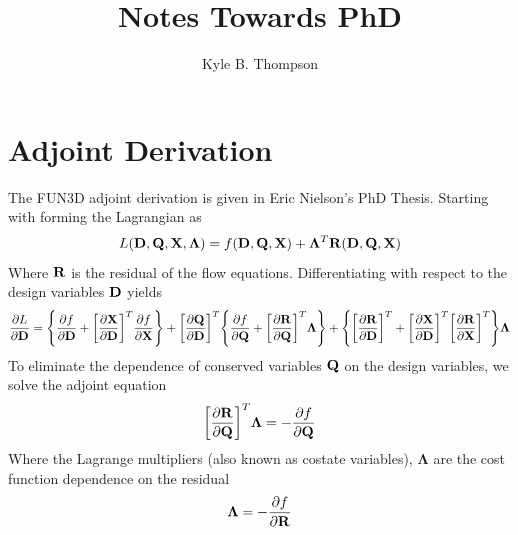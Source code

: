 \documentclass{article}   	%
\title{Notes Towards PhD}
\author{Kyle B. Thompson}
\begin{document}
\maketitle
\section{Adjoint Derivation}

The FUN3D adjoint derivation is given in Eric Nielson's PhD Thesis.  Starting
with forming the Lagrangian as
\begin{equation}
  L({\mathbf D},{\mathbf Q},{\mathbf X},\mathbf{\Lambda})=f({\mathbf D},{\mathbf Q},{\mathbf X})
  +\mathbf{\Lambda}^T{\mathbf R}({\mathbf D},{\mathbf Q},{\mathbf X})
\end{equation}
Where ${\mathbf R}$ is the residual of the flow equations.  Differentiating with respect
to the design variables ${\mathbf D}$ yields
\begin{equation}
  \frac{\partial L}{\partial {\mathbf D}}=
  \Bigg\{\frac{\partial f}{\partial {\mathbf D}}+\bigg[\frac{\partial {\mathbf X}}{\partial {\mathbf D}}\bigg]^T \frac{\partial f}{\partial {\mathbf X}}\Bigg\}
  +\bigg[\frac{\partial {\mathbf Q}}{\partial {\mathbf D}}\bigg]^T
  \Bigg\{\frac{\partial f}{\partial {\mathbf Q}}+\bigg[\frac{\partial {\mathbf R}}{\partial {\mathbf Q}}\bigg]^T \mathbf{\Lambda}\Bigg\}
  +\Bigg\{\bigg[\frac{\partial {\mathbf R}}{\partial {\mathbf D}}\bigg]^T
  +\bigg[\frac{\partial {\mathbf X}}{\partial {\mathbf D}}\bigg]^T\bigg[\frac{\partial {\mathbf R}}{\partial {\mathbf X}}\bigg]^T\Bigg\}\mathbf{\Lambda}
  \label{dL}
\end{equation}
To eliminate the dependence of conserved variables ${\mathbf Q}$ on the design
variables, we solve the adjoint equation
\begin{equation}
  \label{adjoint}
  \bigg[\frac{\partial {\mathbf R}}{\partial {\mathbf Q}}\bigg]^T\mathbf{\Lambda}=
  -\frac{\partial f}{\partial {\mathbf Q}}
\end{equation}
Where the Lagrange multipliers (also known as costate variables),
$\mathbf{\Lambda}$ are the cost function dependence on the residual
\begin{equation}
  \mathbf{\Lambda}=-\frac{\partial f}{\partial {\mathbf R}}
\end{equation}
\end{document}
